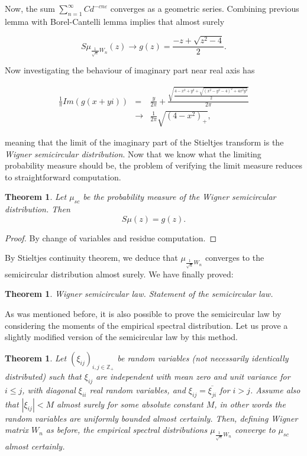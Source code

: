 \documentclass[12pt,a4paper,leqno]{report}
\newcommand{\Z}{\mathbb{Z}}
\theoremstyle{plain}
\newtheorem{theo}[equation]{Theorem}
\theoremstyle{definition}
\theoremstyle{remark}
\begin{document}
Now, the sum $\sum_{n=1}^{\infty} Cd^{-cn\varepsilon}$ converges as a geometric series. Combining previous lemma with Borel-Cantelli lemma implies that almost surely

\begin{equation*}
S\mu_{\frac{1}{\sqrt{n}}W_n}(z) \to g(z) = \frac{-z + \sqrt{z^2-4}}{2}.
\end{equation*}

Now investigating the behaviour of imaginary part near real axis has

\begin{eqnarray*}
\frac{1}{\pi} Im(g(x+yi)) & = &
\frac{y}{2\pi} + \frac{\sqrt{\frac{4-x^2+y^2+\sqrt{(x^2-y^2-4)^2+4x^2y^2}}{2}}}{2\pi}\\
& \to & \frac{1}{2\pi} \sqrt{(4-x^2)_+},
\end{eqnarray*}

meaning that the limit of the imaginary part of the Stieltjes transform is the \emph{Wigner semicircular distribution}. Now that we know what the limiting probability measure should be, the problem of verifying the limit measure reduces to straightforward computation.

\begin{theo}
Let $\mu_{sc}$ be the probability measure of the Wigner semicircular distribution. Then
\begin{equation*}
S\mu(z) = g(z).
\end{equation*}
\end{theo}

\begin{proof}
By change of variables and residue computation.
\end{proof}

By Stieltjes continuity theorem, we deduce that $\mu_{\frac{1}{\sqrt{n}}W_n}$ converges to the semicircular distribution almost surely. We have finally proved:

\begin{theo}
\emph{Wigner semicircular law.} Statement of the semicircular law.
\end{theo}

As was mentioned before, it is also possible to prove the semicircular law by considering the moments of the empirical spectral distribution. Let us prove a slightly modified version of the semicircular law by this method.

\begin{theo}
Let $(\xi_{ij})_{i,j \in \Z_+}$ be random variables (not necessarily identically distributed) such that $\xi_{ij}$
are independent with mean zero and unit variance for $i \leq j$, with diagonal $\xi_{ii}$ real random variables, and $\xi_{ij}=\overline{\xi_{ji}}$ for $i>j$. Assume also that $|\xi_{ij}|<M$ almost surely for some absolute constant $M$, in other words the random variables are uniformly bounded almost certainly.
Then, defining Wigner matrix $W_n$ as before, the empirical spectral distributions $\mu_{\frac{1}{\sqrt{n}}W_n}$ converge to $\mu_{sc}$ almost certainly.
\end{theo}
\end{document}
